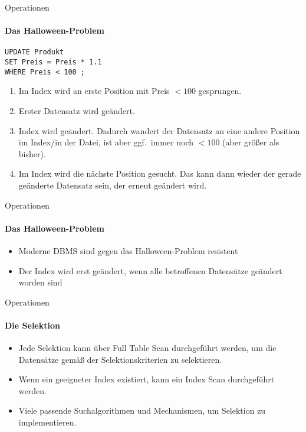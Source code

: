 \begin{frame}[fragile]{Operationen}
\framesubtitle{Das Halloween-Problem}
\abs
	\lstset{captionpos=b}
\begin{lstlisting}[xleftmargin=3ex,  label=lst:halloween]
UPDATE Produkt 
SET Preis = Preis * 1.1 
WHERE Preis < 100 ; 
\end{lstlisting}

\begin{enumerate}
\item Im Index wird an erste Position mit Preis $< 100$ gesprungen. 
\pause
\item Erster Datensatz wird geändert. 
\item Index wird geändert. Dadurch wandert der Datensatz an eine andere Position im Index/in der Datei, 
ist aber ggf.~immer noch $< 100$ (aber größer als bisher).
\pause
\item Im Index wird die nächste Position gesucht. Das kann dann wieder der gerade ge\"anderte Datensatz sein, der erneut geändert wird.
\end{enumerate}
\end{frame}

\begin{frame}[fragile]{Operationen}
\framesubtitle{Das Halloween-Problem}
\pause
\begin{itemize}
\item Moderne DBMS sind gegen das Halloween-Problem resistent 
\item Der Index wird erst geändert, wenn alle betroffenen Datensätze geändert worden sind 
\end{itemize}
\end{frame}

\begin{frame}[fragile]{Operationen}
\framesubtitle{Die Selektion}
\begin{itemize}
	\item Jede Selektion kann \"uber Full Table Scan durchgeführt werden, um die Datensätze 
	{gem\"a\ss} der Selektionskriterien zu selektieren.
	\item Wenn ein geeigneter Index existiert, kann ein Index Scan durchgeführt werden.
	\pause
	\item Viele passende Suchalgorithmen und Mechanismen, um Selektion zu implementieren.
\end{itemize}

\end{frame}

